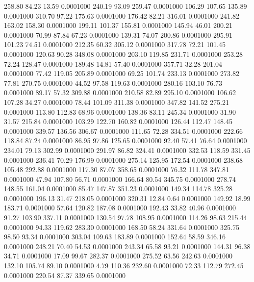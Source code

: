  258.80   84.23   13.59   0.0001000
 240.19   93.09  259.47   0.0001000
 106.29  107.65  135.89   0.0001000
 310.70   97.22  175.63   0.0001000
 176.42   82.21  316.01   0.0001000
 241.82  163.02  158.30   0.0001000
 199.11  101.37  155.81   0.0001000
 145.94   46.01  200.21   0.0001000
  70.99   87.84   67.23   0.0001000
 139.31   74.07  200.86   0.0001000
 295.91  101.23   74.51   0.0001000
 212.35   60.32  305.12   0.0001000
 317.78   72.21  101.45   0.0001000
 120.63   90.28  348.08   0.0001000
 203.10  119.85  231.71   0.0001000
 253.28   72.24  128.47   0.0001000
 189.48   14.81   57.40   0.0001000
 357.71   32.28  201.04   0.0001000
  77.42  119.05  205.89   0.0001000
  69.25  101.74  233.13   0.0001000
 273.82   77.81  270.75   0.0001000
  44.52   97.58  119.63   0.0001000
 280.16  103.10   76.73   0.0001000
  89.17   57.32  309.88   0.0001000
 210.58   82.89  295.10   0.0001000
 106.62  107.28   34.27   0.0001000
  78.44  101.09  311.38   0.0001000
 347.82  141.52  275.21   0.0001000
 113.80  112.83   68.96   0.0001000
 138.36   83.11  245.34   0.0001000
  31.90   31.57  215.84   0.0001000
 103.29  122.70  160.82   0.0001000
 126.44  112.47  148.45   0.0001000
 339.57  136.56  306.67   0.0001000
 111.65   72.28  334.51   0.0001000
 222.66  118.84   87.24   0.0001000
  86.95   97.86  125.65   0.0001000
  92.40   57.41   76.64   0.0001000
 234.01   79.13  302.99   0.0001000
 291.97   86.82  324.41   0.0001000
 332.53  118.59  331.45   0.0001000
 236.41   70.29  176.99   0.0001000
 275.14  125.95  172.54   0.0001000
 238.68  105.48  292.88   0.0001000
 117.30   87.07  358.65   0.0001000
  76.32  111.78  347.81   0.0001000
  47.94  107.80   56.71   0.0001000
 166.64   80.54  345.75   0.0001000
 278.74  148.55  161.04   0.0001000
  85.47  147.87  351.23   0.0001000
 149.34  114.78  325.28   0.0001000
 196.13   31.47  218.05   0.0001000
 320.31   12.84    0.64   0.0001000
 149.92   18.99  183.71   0.0001000
  57.64  120.82  187.08   0.0001000
 192.43   33.82   40.96   0.0001000
  91.27  103.90  337.11   0.0001000
 130.54   97.78  108.95   0.0001000
 114.26   98.63  215.44   0.0001000
  94.33  119.62  283.30   0.0001000
 168.50   58.24  331.64   0.0001000
 325.75   98.50   93.34   0.0001000
 303.04  109.63  183.89   0.0001000
 152.64   58.59  346.16   0.0001000
 248.21   70.40   54.53   0.0001000
 243.34   65.58   93.21   0.0001000
 144.31   96.38   34.71   0.0001000
  17.09   99.67  282.37   0.0001000
 275.52   63.56  242.63   0.0001000
 132.10  105.74   89.10   0.0001000
   4.79  110.36  232.60   0.0001000
  72.33  112.79  272.45   0.0001000
 220.54   87.37  339.65   0.0001000

